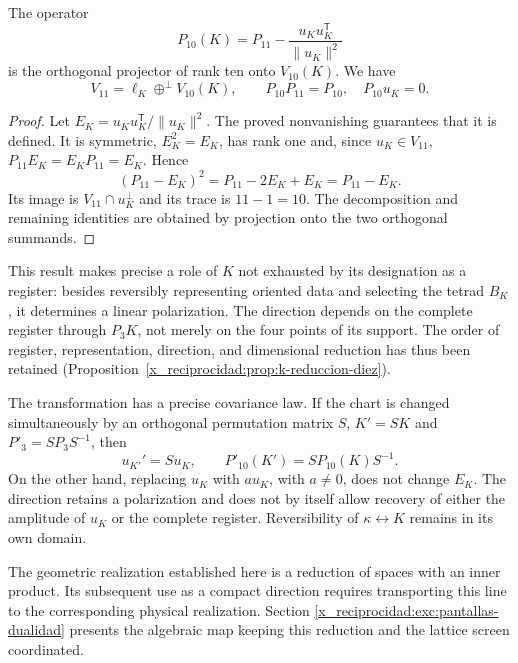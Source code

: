 \begin{proposition}
\label{x_reciprocidad:prop:k-reduccion-diez}
The operator
\begin{equation}
 P_{10}(K)=P_{11}
       -\frac{u_Ku_K^{\mathsf T}}{\lVert u_K\rVert^2}
 \label{x_reciprocidad:eq:k-proyector-diez}
\end{equation}
is the orthogonal projector of rank ten onto \(V_{10}(K)\). We have
\[
 V_{11}=\ell_K\mathbin{\oplus^{\perp}}V_{10}(K),
 \qquad P_{10}P_{11}=P_{10},\quad P_{10}u_K=0.
\]
\end{proposition}
\begin{proof}
Let \(E_K=u_Ku_K^{\mathsf T}/\lVert u_K\rVert^2\). The
proved nonvanishing guarantees that it is defined. It is symmetric,
\(E_K^2=E_K\), has rank one and, since \(u_K\in V_{11}\),
\(P_{11}E_K=E_KP_{11}=E_K\). Hence
\[
 (P_{11}-E_K)^2=P_{11}-2E_K+E_K=P_{11}-E_K.
\]
Its image is \(V_{11}\cap u_K^\perp\) and its trace is
\(11-1=10\). The decomposition and remaining identities are
obtained by projection onto the two orthogonal summands.
\end{proof}

This result makes precise a role of \(K\) not exhausted by its designation
as a register: besides reversibly representing oriented
data and selecting the tetrad \(B_K\), it determines a
linear polarization. The direction depends on the complete register through
\(P_3K\), not merely on the four points of its support.
The order of register, representation, direction, and dimensional
reduction has thus been retained (Proposition~\ref{x_reciprocidad:prop:k-reduccion-diez}).

The transformation has a precise covariance law. If the chart is changed
simultaneously by an orthogonal permutation matrix \(S\),
\(K'=SK\) and \(P'_3=SP_3S^{-1}\), then
\[
 u_{K'}'=Su_K,\qquad P'_{10}(K')=SP_{10}(K)S^{-1}.
\]
On the other hand, replacing \(u_K\) with \(a u_K\), with \(a\ne0\),
does not change \(E_K\). The direction retains a polarization and does not
by itself allow recovery of either the amplitude of \(u_K\) or the
complete register. Reversibility of \(\kappa\leftrightarrow K\)
remains in its own domain.

The geometric realization established here is a reduction of spaces
with an inner product. Its subsequent use as a compact direction
requires transporting this line to the corresponding physical realization.
Section \ref{x_reciprocidad:exc:pantallas-dualidad} presents the algebraic map
keeping this reduction and the lattice screen coordinated.

